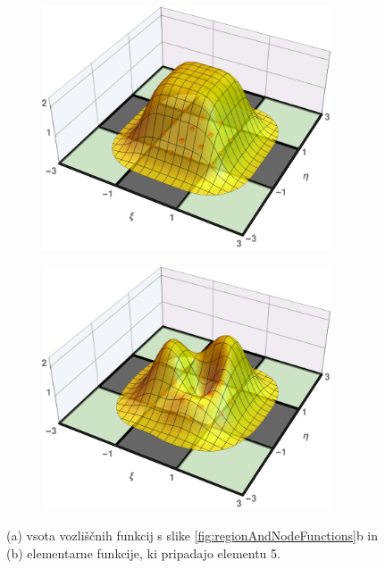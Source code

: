 \begin{figure}[ht]
   \centering
   \begin{subfigure}[b]{0.48\textwidth}
      \centering
      \includegraphics[width=0.94\textwidth]{Slike/nodalFuncsSumOverElm}
      \vspace{0mm}
      \caption{}
   \end{subfigure}
   \begin{subfigure}[b]{0.48\textwidth}
      \centering
      \includegraphics[width=0.94\textwidth]{Slike/nodalFuncsSumOverElmMod}
      \caption{}
   \end{subfigure}
   \caption{(a) vsota vozliščnih funkcij s slike \ref{fig:regionAndNodeFunctions}b in (b) elementarne funkcije, ki pripadajo elementu 5.}
   \label{fig:sumAndShapeFunctions}
\end{figure}

